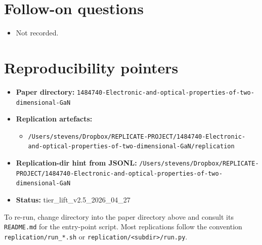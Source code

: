 \documentclass[11pt]{article}
\begin{document}
\section{Follow-on questions}
\begin{itemize}
\item Not recorded.
\end{itemize}

\section{Reproducibility pointers}\label{sec:repro}
\begin{itemize}
\item \textbf{Paper directory:} \texttt{1484740-Electronic-and-optical-properties-of-two-dimensional-GaN}
\item \textbf{Replication artefacts:}
\begin{itemize}
\item \texttt{/Users/stevens/Dropbox/REPLICATE-PROJECT/1484740-Electronic-and-optical-properties-of-two-dimensional-GaN/replication}
\end{itemize}
\item \textbf{Replication-dir hint from JSONL:} \texttt{/Users/stevens/Dropbox/REPLICATE-PROJECT/1484740-Electronic-and-optical-properties-of-two-dimensional-GaN}
\item \textbf{Status:} tier\_lift\_v2.5\_2026\_04\_27
\end{itemize}

To re-run, change directory into the paper directory above and consult its \texttt{README.md} for the entry-point script. Most replications follow the convention \texttt{replication/run\_*.sh} or \texttt{replication/<subdir>/run.py}.
\end{document}
